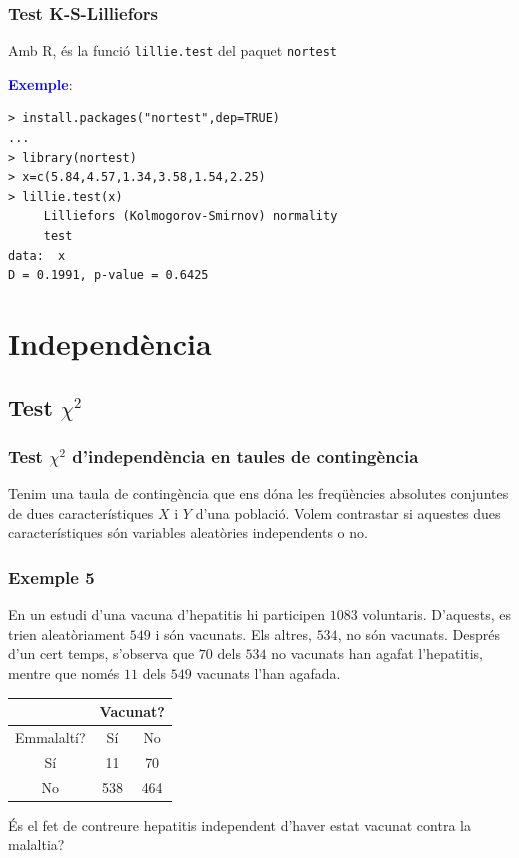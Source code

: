 \documentclass[12pt,t]{beamer}
\newcommand{\blue}[1]{\textcolor{blue}{#1}}
\theoremstyle{plain}
\theoremstyle{definition}
\begin{document}
\begin{frame}[fragile]
\frametitle{Test K-S-Lilliefors}


Amb R, és la funció \texttt{lillie.test} del paquet \texttt{nortest}
\medskip

\blue{\bf Exemple}: 
\begin{verbatim}
> install.packages("nortest",dep=TRUE)
...
> library(nortest)
> x=c(5.84,4.57,1.34,3.58,1.54,2.25)
> lillie.test(x)
     Lilliefors (Kolmogorov-Smirnov) normality 
     test
data:  x 
D = 0.1991, p-value = 0.6425
\end{verbatim}

\end{frame}



    

\section{Independència}
\subsection{Test $\chi^2$}

\begin{frame}
\frametitle{Test $\chi^2$ d'independència en taules de contingència}

Tenim una taula de contingència que ens dóna les freqüències absolutes conjuntes de dues característiques  $X$ i $Y$ d'una població. Volem contrastar si aquestes dues característiques són variables aleatòries
independents  o no.

\end{frame}

\begin{frame}
\frametitle{Exemple 5}

En un estudi d'una vacuna d'hepatitis hi participen $1083$ voluntaris. D'aquests, es trien aleatòriament $549$ i són vacunats. Els altres, $534$, no són vacunats. Després d'un cert temps, s'observa que $70$ dels $534$ no vacunats han agafat l'hepatitis, mentre que només $11$ dels $549$ vacunats l'han agafada.
\begin{center}
 \begin{tabular}{c|cc}
\hline &\multicolumn{2}{c}{Vacunat?}\\\hline 
Emmalaltí?& Sí &No \\\hline
Sí &11& 70 \\
No& 538 &464\\\hline
 \end{tabular}
\end{center}
És el fet de contreure hepatitis
independent d'haver estat vacunat contra la malaltia?

\end{frame}
\end{document}
